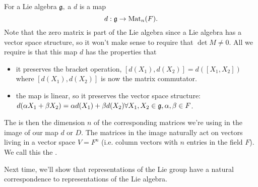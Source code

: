 \begin{defn}
For a Lie algebra $\mathfrak{g},$ a  $d$ is a map
$$d:\mathfrak{g}\to \text{Mat}_n(F).$$
Note that the zero matrix is part of the Lie algebra since a Lie algebra has a vector space structure, so it won't make sense to require that $\det M\neq 0$. All we require is that this map $d$ has the properties that
\begin{itemize}
    \item it preserves the bracket operation, $[d(X_1),d(X_2)]=d([X_1,X_2])$ where $[d(X_1),d(X_2)]$ is now the matrix commutator.
    \item the map is linear, so it preserves the vector space structure: $d(\alpha X_1+\beta X_2)=\alpha d(X_1)+\beta d(X_2) \forall X_1,X_2\in \mathfrak{g}, \alpha,\beta \in F$.
\end{itemize}
\end{defn}

The  is then the dimension $n$ of the corresponding matrices we're using in the image of our map $d$ or $D$. The matrices in the image naturally act on vectors living in a vector space $V=F^n$ (i.e. column vectors with $n$ entries in the field $F$). We call this the .

Next time, we'll show that representations of the Lie group have a natural correspondence to representations of the Lie algebra.